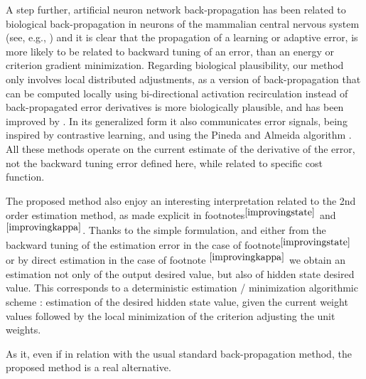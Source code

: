 A step further, artificial neuron network back-propagation has been related to biological back-propagation in neurons of the mammalian central nervous system (see, e.g., \cite{Stuartetal1997}) and it is clear that the propagation of a learning or adaptive error, is more likely to be related to backward tuning of an error, than an energy or criterion gradient minimization. Regarding biological plausibility, our method only involves local distributed adjustments, as a version of back-propagation that can be computed locally using bi-directional activation recirculation \cite{HintonMcClelland1988} instead of back-propagated error derivatives is more biologically plausible, and has been improved by \cite{OReilly1996recirculation}. In its generalized form it also communicates error signals, being inspired by contrastive learning, and using the Pineda and Almeida algorithm \cite{Pineda1987}. All these methods operate on the current estimate of the derivative of the error, not the backward tuning error defined here, while related to specific cost function.

The proposed method also enjoy an interesting interpretation related to the 2nd order estimation method, as made explicit in footnotes${}^{\ref{improvingstate}}$ and ${}^{\ref{improvingkappa}}$. Thanks to the simple formulation, and either from the backward tuning of the estimation error in the case of footnote${}^{\ref{improvingstate}}$ or by direct estimation in the case of footnote ${}^{\ref{improvingkappa}}$ we obtain an estimation not only of the output desired value, but also of hidden state desired value. This corresponds to a deterministic estimation / minimization algorithmic scheme : estimation of the desired hidden state value, given the current weight values followed by the local minimization of the criterion adjusting the unit weights.

As it, even if in relation with the usual standard back-propagation method, the proposed method is a real alternative.




